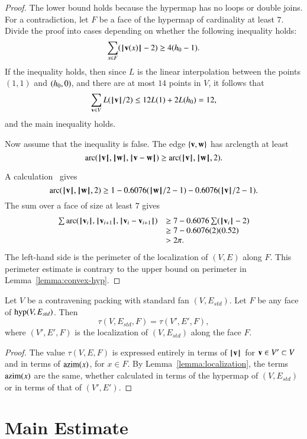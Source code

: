 \begin{proof} The lower bound holds because the hypermap has no loops or double joins.  For a contradiction, let $F$ be a face of the hypermap of cardinality at least $7$.  Divide the proof into cases depending on whether the
following inequality holds:
$$
\sum _{x\in F} (\normo{\v(x)}-2) \ge 4(\hm-1).
$$
If the inequality holds, then since $L$ is the linear interpolation between the points $(1,1)$ and $(\hm,0)$, and there are at most $14$ points in $V$, it follows that
$$\sum_{\v\in V}L(\normo{\v}/2) \le 12 L(1) + 2 L(\hm) =12,$$
and the main inequality holds.

Now assume that the inequality is false.
The edge $\{\v,\w\}$ has arclength at least
$$
\arc(\normo{\v},\normo{\w},\norm{\v}{\w}) \ge \arc(\normo{\v},\normo{\w},2). 
$$

A calculation~\cite[cc:arc]{hales:2009:nonlinear} gives
$$\arc(\normo{\v},\normo{\w},2)\ge 1 - 0.6076 (\normo{\w}/2 - 1) - 0.6076 (\normo{\v}/2 - 1).$$ %
The sum over a face of size at least $7$ gives
$$
\begin{array}{lll}
\sum \arc(\normo{\v_i},\normo{\v_{i+1}},\norm{\v_i}{\v_{i+1}})&\ge
7 - 0.6076 \sum (\normo{\v_i}-2) \\
   &\ge 7 - 0.6076 (2) (0.52) \\
   &> 2\pi.
\end{array}
$$
The left-hand side is the perimeter of the localization of $(V,E)$ along $F$.
This perimeter estimate is contrary to the upper bound on perimeter in Lemma~\ref{lemma:convex-hyp}.
\end{proof}

\begin{lemma}  Let $V$ be a contravening packing with
standard fan $(V,E_{std})$.  Let $F$ be any face of $\op{hyp}(V,E_{std})$.  Then
$$
\tau(V,E_{std},F) = \tau(V',E',F),
$$
where $(V',E',F)$ is the localization of $(V,E_{std})$ along the face $F$.
\end{lemma}

\begin{proof}  The value $\tau(V,E,F)$ is expressed entirely in terms of $\normo{\v}$ for $\v\in V'\subset V$ and in terms of $\op{azim}(x)$, for $x\in F$.  By Lemma~\ref{lemma:localization}, the terms $\op{azim}(x)$ are the same, whether calculated in terms of the hypermap of $(V,E_{std})$ or in terms of that of $(V',E')$. 
\end{proof}


\section{Main Estimate}\label{sec:weight}  


